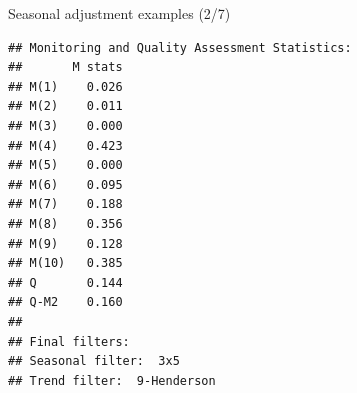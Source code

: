 \documentclass[10pt,xcolor=table,color={dvipsnames,usenames},ignorenonframetext,usepdftitle=false,french]{beamer}
\newenvironment{Shaded}{\begin{snugshade}}{\end{snugshade}}
\newcommand{\OperatorTok}[1]{\textcolor[rgb]{0.81,0.36,0.00}{\textbf{#1}}}
\newcommand{\NormalTok}[1]{#1}
\begin{document}
\begin{frame}[fragile]{Seasonal adjustment examples (2/7)}

\footnotesize

\begin{Shaded}
\end{Shaded}

\begin{verbatim}
## Monitoring and Quality Assessment Statistics: 
##       M stats
## M(1)    0.026
## M(2)    0.011
## M(3)    0.000
## M(4)    0.423
## M(5)    0.000
## M(6)    0.095
## M(7)    0.188
## M(8)    0.356
## M(9)    0.128
## M(10)   0.385
## Q       0.144
## Q-M2    0.160
## 
## Final filters: 
## Seasonal filter:  3x5
## Trend filter:  9-Henderson
\end{verbatim}

\end{frame}
\end{document}
